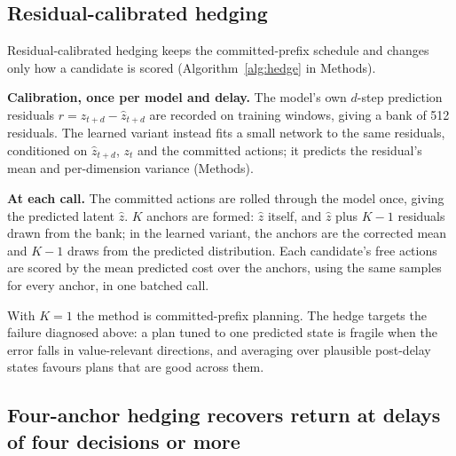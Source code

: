 \documentclass[aps,physrev,\manuscriptlayout,superscriptaddress,
  longbibliography,amsmath,amssymb]{revtex4-2}
\begin{document}
\subsection{Residual-calibrated hedging}\label{sec:hedged-scoring}

Residual-calibrated hedging keeps the committed-prefix schedule and changes only how a candidate is scored (Algorithm~\ref{alg:hedge} in Methods).

\textbf{Calibration, once per model and delay.} The model's own $d$-step prediction residuals $r = z_{t+d} - \hat z_{t+d}$ are recorded on training windows, giving a bank of 512 residuals. The learned variant instead fits a small network to the same residuals, conditioned on $\hat z_{t+d}$, $z_t$ and the committed actions; it predicts the residual's mean and per-dimension variance (Methods).

\textbf{At each call.} The committed actions are rolled through the model once, giving the predicted latent $\hat z$. $K$ anchors are formed: $\hat z$ itself, and $\hat z$ plus $K-1$ residuals drawn from the bank; in the learned variant, the anchors are the corrected mean and $K-1$ draws from the predicted distribution. Each candidate's free actions are scored by the mean predicted cost over the anchors, using the same samples for every anchor, in one batched call.

With $K=1$ the method is committed-prefix planning. The hedge targets the failure diagnosed above: a plan tuned to one predicted state is fragile when the error falls in value-relevant directions, and averaging over plausible post-delay states favours plans that are good across them.

\subsection{Four-anchor hedging recovers return at delays of four decisions or more}\label{sec:closedloop}
\end{document}

